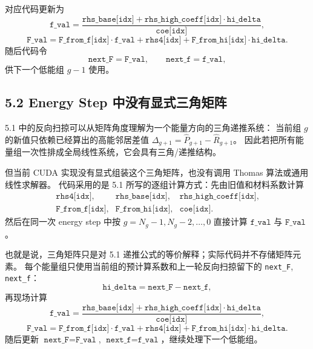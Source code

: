 \documentclass[11pt,a4paper]{ctexart}
\begin{document}
对应代码更新为
\begin{equation}
  \texttt{f\_val}
  =
  \frac{
    \texttt{rhs\_base[idx]}
    +
    \texttt{rhs\_high\_coeff[idx]}\cdot\texttt{hi\_delta}
  }{
    \texttt{coe[idx]}
  },
\end{equation}
\begin{equation}
  \texttt{F\_val}
  =
  \texttt{F\_from\_f[idx]}\cdot\texttt{f\_val}
  +
  \texttt{rhs4[idx]}
  +
  \texttt{F\_from\_hi[idx]}\cdot\texttt{hi\_delta}.
\end{equation}
随后代码令
\begin{equation}
  \texttt{next\_F}=\texttt{F\_val},
  \qquad
  \texttt{next\_f}=\texttt{f\_val},
\end{equation}
供下一个低能组 \(g-1\) 使用。

\subsection*{5.2 Energy Step 中没有显式三角矩阵}

5.1 中的反向扫掠可以从矩阵角度理解为一个能量方向的三角递推系统：
当前组 \(g\) 的新值只依赖已经算出的高能邻居差值
\(\Delta_{g+1}=\widehat P_{g+1}-\widehat R_{g+1}\)。
因此若把所有能量组一次性排成全局线性系统，它会具有三角/递推结构。

但当前 CUDA 实现没有显式组装这个三角矩阵，也没有调用 Thomas 算法或通用线性求解器。
代码采用的是 5.1 所写的逐组计算方式：先由旧值和材料系数计算
\begin{equation}
\begin{array}{lll}
\texttt{rhs4[idx]}, & \texttt{rhs\_base[idx]}, & \texttt{rhs\_high\_coeff[idx]},\\
\texttt{F\_from\_f[idx]}, & \texttt{F\_from\_hi[idx]}, & \texttt{coe[idx]}.
\end{array}
\end{equation}
然后在同一次 energy step 中按
\(g=N_g-1,N_g-2,\ldots,0\) 直接计算
\(\texttt{f\_val}\) 与 \(\texttt{F\_val}\)。

也就是说，三角矩阵只是对 5.1 递推公式的等价解释；实际代码并不存储矩阵元素。
每个能量组只使用当前组的预计算系数和上一轮反向扫掠留下的
\texttt{next\_F}, \texttt{next\_f}：
\begin{equation}
  \texttt{hi\_delta}=\texttt{next\_F}-\texttt{next\_f},
\end{equation}
再现场计算
\begin{equation}
  \texttt{f\_val}
  =
  \frac{
    \texttt{rhs\_base[idx]}
    +
    \texttt{rhs\_high\_coeff[idx]}\cdot\texttt{hi\_delta}
  }{
    \texttt{coe[idx]}
  },
\end{equation}
\begin{equation}
  \texttt{F\_val}
  =
  \texttt{F\_from\_f[idx]}\cdot\texttt{f\_val}
  +
  \texttt{rhs4[idx]}
  +
  \texttt{F\_from\_hi[idx]}\cdot\texttt{hi\_delta}.
\end{equation}
随后更新
\(\texttt{next\_F}=\texttt{F\_val}\),
\(\texttt{next\_f}=\texttt{f\_val}\)，继续处理下一个低能组。
\end{document}

